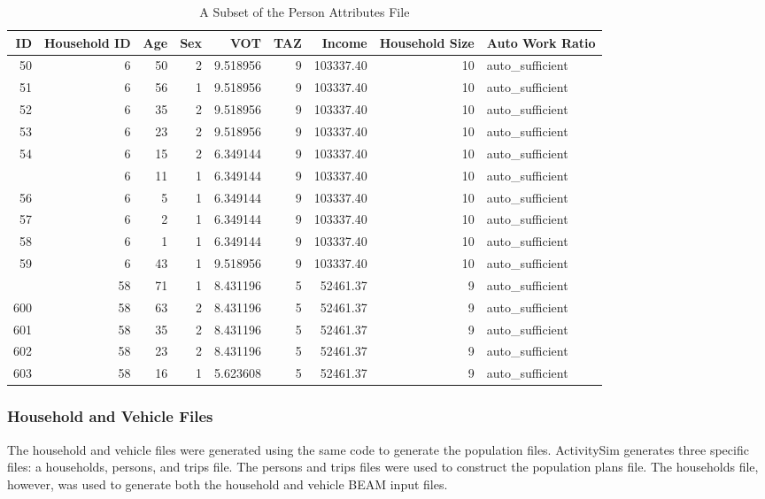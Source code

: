 \documentclass[12pt, oneside, openright]{byuthesis}
\begin{document}
\begin{table}

\caption{\label{tab:peratt}A Subset of the Person Attributes File}
\centering
\begin{tabular}[t]{rrrrrrrrl}
\toprule
ID & Household ID & Age & Sex & VOT & TAZ & Income & Household Size & Auto Work Ratio\\
\midrule
50 & 6 & 50 & 2 & 9.518956 & 9 & 103337.40 & 10 & auto\_sufficient\\
51 & 6 & 56 & 1 & 9.518956 & 9 & 103337.40 & 10 & auto\_sufficient\\
52 & 6 & 35 & 2 & 9.518956 & 9 & 103337.40 & 10 & auto\_sufficient\\
53 & 6 & 23 & 2 & 9.518956 & 9 & 103337.40 & 10 & auto\_sufficient\\
54 & 6 & 15 & 2 & 6.349144 & 9 & 103337.40 & 10 & auto\_sufficient\\
\addlinespace
55 & 6 & 11 & 1 & 6.349144 & 9 & 103337.40 & 10 & auto\_sufficient\\
56 & 6 & 5 & 1 & 6.349144 & 9 & 103337.40 & 10 & auto\_sufficient\\
57 & 6 & 2 & 1 & 6.349144 & 9 & 103337.40 & 10 & auto\_sufficient\\
58 & 6 & 1 & 1 & 6.349144 & 9 & 103337.40 & 10 & auto\_sufficient\\
59 & 6 & 43 & 1 & 9.518956 & 9 & 103337.40 & 10 & auto\_sufficient\\
\addlinespace
599 & 58 & 71 & 1 & 8.431196 & 5 & 52461.37 & 9 & auto\_sufficient\\
600 & 58 & 63 & 2 & 8.431196 & 5 & 52461.37 & 9 & auto\_sufficient\\
601 & 58 & 35 & 2 & 8.431196 & 5 & 52461.37 & 9 & auto\_sufficient\\
602 & 58 & 23 & 2 & 8.431196 & 5 & 52461.37 & 9 & auto\_sufficient\\
603 & 58 & 16 & 1 & 5.623608 & 5 & 52461.37 & 9 & auto\_sufficient\\
\bottomrule
\end{tabular}
\end{table}

\hypertarget{household-and-vehicle-files}{%
\subsubsection{Household and Vehicle Files}\label{household-and-vehicle-files}}

The household and vehicle files were generated using the same code to generate the population files. ActivitySim generates three specific files: a households, persons, and trips file. The persons and trips files were used to construct the population plans file. The households file, however, was used to generate both the household and vehicle BEAM input files.
\end{document}
